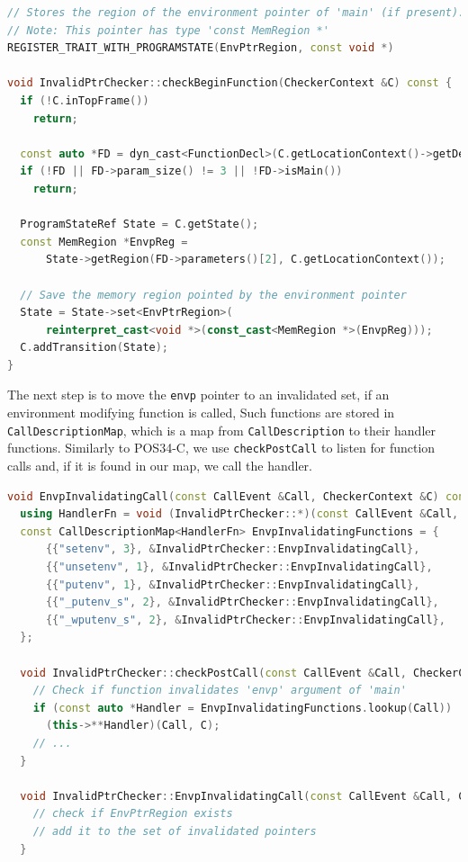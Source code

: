 \begin{lstlisting}[language={C++}]
// Stores the region of the environment pointer of 'main' (if present).
// Note: This pointer has type 'const MemRegion *'
REGISTER_TRAIT_WITH_PROGRAMSTATE(EnvPtrRegion, const void *)

void InvalidPtrChecker::checkBeginFunction(CheckerContext &C) const {
  if (!C.inTopFrame())
    return;

  const auto *FD = dyn_cast<FunctionDecl>(C.getLocationContext()->getDecl());
  if (!FD || FD->param_size() != 3 || !FD->isMain())
    return;

  ProgramStateRef State = C.getState();
  const MemRegion *EnvpReg =
      State->getRegion(FD->parameters()[2], C.getLocationContext());

  // Save the memory region pointed by the environment pointer
  State = State->set<EnvPtrRegion>(
      reinterpret_cast<void *>(const_cast<MemRegion *>(EnvpReg)));
  C.addTransition(State);
}
\end{lstlisting}

The next step is to move the \lstinline{envp} pointer to an invalidated set, if an environment modifying function is called,
Such functions are stored in \lstinline{CallDescriptionMap}, which is a map from \lstinline{CallDescription} to their handler functions.
Similarly to POS34-C, we use \lstinline{checkPostCall} to listen for function calls and, if it is found in our map, we call the handler. 


\begin{lstlisting}[language={C++}]
  void EnvpInvalidatingCall(const CallEvent &Call, CheckerContext &C) const;
  using HandlerFn = void (InvalidPtrChecker::*)(const CallEvent &Call, CheckerContext &C) const;
  const CallDescriptionMap<HandlerFn> EnvpInvalidatingFunctions = {
      {{"setenv", 3}, &InvalidPtrChecker::EnvpInvalidatingCall},
      {{"unsetenv", 1}, &InvalidPtrChecker::EnvpInvalidatingCall},
      {{"putenv", 1}, &InvalidPtrChecker::EnvpInvalidatingCall},
      {{"_putenv_s", 2}, &InvalidPtrChecker::EnvpInvalidatingCall},
      {{"_wputenv_s", 2}, &InvalidPtrChecker::EnvpInvalidatingCall},
  };
  
  void InvalidPtrChecker::checkPostCall(const CallEvent &Call, CheckerContext &C) const {
    // Check if function invalidates 'envp' argument of 'main'
    if (const auto *Handler = EnvpInvalidatingFunctions.lookup(Call))
      (this->**Handler)(Call, C);
    // ...
  }
  
  void InvalidPtrChecker::EnvpInvalidatingCall(const CallEvent &Call, CheckerContext &C) const {
    // check if EnvPtrRegion exists
    // add it to the set of invalidated pointers
  }
\end{lstlisting}

